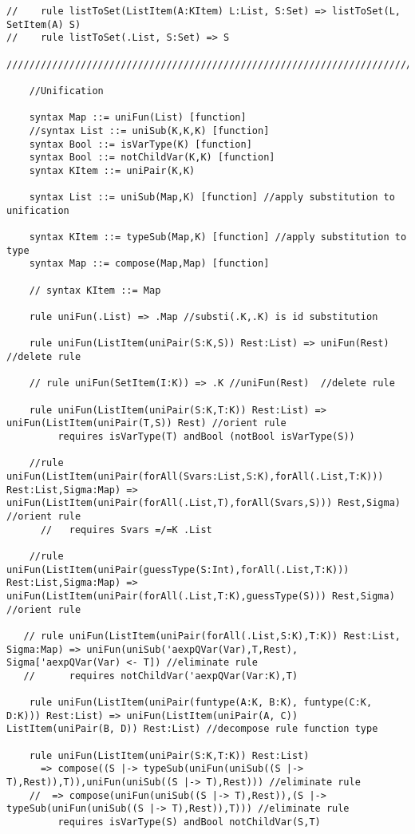 \begin{lstlisting}
//    rule listToSet(ListItem(A:KItem) L:List, S:Set) => listToSet(L, SetItem(A) S)
//    rule listToSet(.List, S:Set) => S

////////////////////////////////////////////////////////////////////////////////////////////////////////////////////////

    //Unification

    syntax Map ::= uniFun(List) [function]
    //syntax List ::= uniSub(K,K,K) [function]
    syntax Bool ::= isVarType(K) [function]
    syntax Bool ::= notChildVar(K,K) [function]
    syntax KItem ::= uniPair(K,K)

    syntax List ::= uniSub(Map,K) [function] //apply substitution to unification

    syntax KItem ::= typeSub(Map,K) [function] //apply substitution to type
    syntax Map ::= compose(Map,Map) [function]

    // syntax KItem ::= Map

    rule uniFun(.List) => .Map //substi(.K,.K) is id substitution

    rule uniFun(ListItem(uniPair(S:K,S)) Rest:List) => uniFun(Rest)  //delete rule

    // rule uniFun(SetItem(I:K)) => .K //uniFun(Rest)  //delete rule

    rule uniFun(ListItem(uniPair(S:K,T:K)) Rest:List) => uniFun(ListItem(uniPair(T,S)) Rest) //orient rule
         requires isVarType(T) andBool (notBool isVarType(S))

    //rule uniFun(ListItem(uniPair(forAll(Svars:List,S:K),forAll(.List,T:K))) Rest:List,Sigma:Map) => uniFun(ListItem(uniPair(forAll(.List,T),forAll(Svars,S))) Rest,Sigma) //orient rule
      //   requires Svars =/=K .List

    //rule uniFun(ListItem(uniPair(guessType(S:Int),forAll(.List,T:K))) Rest:List,Sigma:Map) => uniFun(ListItem(uniPair(forAll(.List,T:K),guessType(S))) Rest,Sigma) //orient rule

   // rule uniFun(ListItem(uniPair(forAll(.List,S:K),T:K)) Rest:List, Sigma:Map) => uniFun(uniSub('aexpQVar(Var),T,Rest), Sigma['aexpQVar(Var) <- T]) //eliminate rule
   //      requires notChildVar('aexpQVar(Var:K),T)

    rule uniFun(ListItem(uniPair(funtype(A:K, B:K), funtype(C:K, D:K))) Rest:List) => uniFun(ListItem(uniPair(A, C)) ListItem(uniPair(B, D)) Rest:List) //decompose rule function type

    rule uniFun(ListItem(uniPair(S:K,T:K)) Rest:List) 
      => compose((S |-> typeSub(uniFun(uniSub((S |-> T),Rest)),T)),uniFun(uniSub((S |-> T),Rest))) //eliminate rule
    //  => compose(uniFun(uniSub((S |-> T),Rest)),(S |-> typeSub(uniFun(uniSub((S |-> T),Rest)),T))) //eliminate rule
         requires isVarType(S) andBool notChildVar(S,T)


\end{lstlisting}
